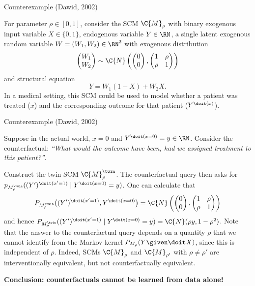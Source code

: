 \begin{frame}{Counterexample (Dawid, 2002)}
\begin{example}[1/2]
  For parameter $\rho\in[0,1]$, consider the SCM $\C{M}_\rho$ with binary exogenous input variable $X \in \{0,1\}$, endogenous variable $Y \in \RN$, a single latent exogenous random variable $W = (W_1,W_2) \in \RN^2$ with
exogenous distribution 
  $$\begin{pmatrix} W_1 \\ W_2 \end{pmatrix}\sim\C{N}\left(\begin{pmatrix}0 \\ 0\end{pmatrix},\begin{pmatrix}1&\rho\\ \rho&1\end{pmatrix}\right)$$
and structural equation
  $$Y = W_1 (1 - X) + W_2 X.$$
  In a medical setting, this SCM could be used to model whether a patient was treated ($x$) and the corresponding outcome for that patient ($Y^{\doit(x)}$).
\end{example}
\end{frame}

\begin{frame}{Counterexample (Dawid, 2002)}
\begin{example}[2/2]
  Suppose in the actual world, $x = 0$ and $Y^{\doit(x=0)} = y \in \RN$.
  Consider the counterfactual: {\it ``What would the outcome have been, had we assigned treatment to this patient?''}.

  Construct the twin SCM $\C{M}_{\rho}^{\twin}$.
  The counterfactual query then asks for $p_{M_{\rho}^\twin}((Y')^{\doit(x'=1)}\mid Y^{\doit(x=0)}=y)$. One can calculate that
$$
  P_{M_{\rho}^\twin}\big((Y')^{\doit(x'=1)},Y^{\doit(x=0)}\big) = \C{N}\left(\begin{pmatrix}0\\ 0\end{pmatrix}, \begin{pmatrix} 1 & \rho \\ \rho & 1 \end{pmatrix}\right)
$$
  and hence $P_{M_{\rho}^\twin}((Y')^{\doit(x'=1)} \mid Y^{\doit(x=0)}=y) = \C{N}(\rho y,1-\rho^2)$. Note that the answer to the counterfactual query depends on a quantity $\rho$ that we cannot identify from the Markov kernel $P_{M_{\rho}}(Y\given \doit X)$, since this is independent of $\rho$. 
Indeed, SCMs $\C{M}_{\rho}$ and $\C{M}_{\rho'}$ with $\rho\neq\rho'$ are interventionally equivalent, but not counterfactually equivalent.
\end{example}
  \textbf{Conclusion: counterfactuals cannot be learned from data alone!}
\end{frame}

